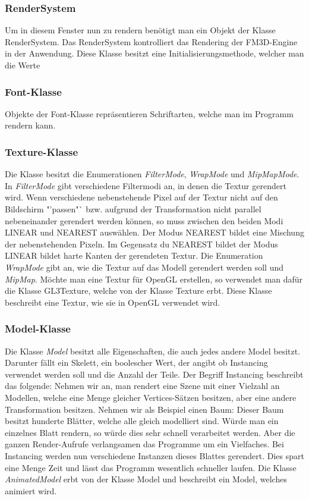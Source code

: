 \subsubsection{RenderSystem}
Um in diesem Fenster nun zu rendern benötigt man ein Objekt der Klasse RenderSystem. Das RenderSystem kontrolliert das Rendering der FM3D-Engine in der Anwendung. Diese Klasse besitzt eine Initialisierungsmethode, welcher man die Werte 

\subsubsection{Font-Klasse}
\label{Fontclass}
Objekte der Font-Klasse repräsentieren Schriftarten, welche man im Programm rendern kann.

\subsubsection{Texture-Klasse}
\label{Textureclass}
Die Klasse besitzt die Enumerationen \textit{FilterMode}, \textit{WrapMode} und \textit{MipMapMode}. In \textit{FilterMode} gibt verschiedene Filtermodi an, in denen die Textur gerendert wird.
Wenn verschiedene nebenstehende Pixel auf der Textur nicht auf den Bildschirm "'passen"` bzw. aufgrund der Transformation nicht parallel nebeneinander gerendert werden können, so muss zwischen den beiden Modi LINEAR und NEAREST auswählen. Der Modus NEAREST bildet eine Mischung der nebenstehenden Pixeln. 
Im Gegensatz du NEAREST bildet der Modus LINEAR bildet harte Kanten der gerendeten Textur.
Die Enumeration \textit{WrapMode} gibt an, wie die Textur auf das Modell gerendert werden soll und \textit{MipMap}.
Möchte man eine Textur für OpenGL erstellen, so verwendet man dafür die Klasse GL3Texture, welche von der Klasse Texture erbt. Diese Klasse beschreibt eine Textur, wie sie in OpenGL verwendet wird.

\subsubsection{Model-Klasse}
\label{Modelclass}
Die Klasse \textit{Model} besitzt alle Eigenschaften, die auch jedes andere Model besitzt. Darunter fällt ein Skelett, ein boolescher Wert, der angibt ob Instancing verwendet werden soll und die Anzahl der Teile. 
Der Begriff Instancing beschreibt das folgende:
Nehmen wir an, man rendert eine Szene mit einer Vielzahl an Modellen, welche eine Menge gleicher Vertices-Sätzen besitzen, aber eine andere Transformation besitzen.
Nehmen wir als Beispiel einen Baum:
Dieser Baum besitzt hunderte Blätter, welche alle gleich modelliert sind. Würde man ein einzelnes Blatt rendern, so würde dies sehr schnell verarbeitet werden. Aber die ganzen Render-Aufrufe verlangsamen das Programme um ein Vielfaches. 
Bei Instancing werden nun verschiedene Instanzen dieses Blattes gerendert. Dies spart eine Menge Zeit und lässt das Programm wesentlich schneller laufen.
Die Klasse \textit{AnimatedModel} erbt von der Klasse Model und beschreibt ein Model, welches animiert wird.

